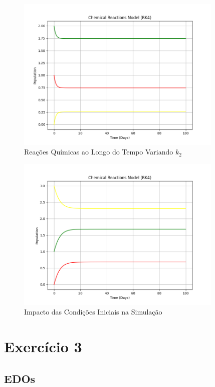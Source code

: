 \documentclass[a4paper, 12pt]{article}
\begin{document}
\begin{figure}[H]
    \centering
    \includegraphics[width=0.88\textwidth]{Images/Exercise 2/k2.png}
    \caption{Reações Químicas ao Longo do Tempo Variando \(k_2\)}
    \label{fig:exampleFig8}
\end{figure}

\begin{figure}[H]
    \centering
    \includegraphics[width=0.88\textwidth]{Images/Exercise 2/ic.png}
    \caption{Impacto das Condições Iniciais na Simulação}
    \label{fig:exampleFig9}
\end{figure}

\section*{Exercício 3}

\subsection*{EDOs}
\end{document}
